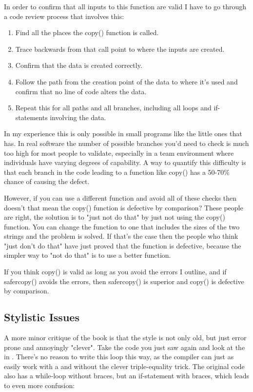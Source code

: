 In order to confirm that all inputs to this function are valid I have to 
go through a code review process that involves this:

\begin{enumerate}
\item Find all the places the copy() function is called.
\item Trace backwards from that call point to where the inputs are created.
\item Confirm that the data is created correctly.
\item Follow the path from the creation point of the data to where it's used and confirm that
    no line of code alters the data.
\item Repeat this for all paths and all branches, including all loops and if-statements
    involving the data.
\end{enumerate}

In my experience this is only possible in small programs like the little ones
that \krc has.  In real software the number of possible branches you'd need to
check is much too high for most people to validate, especially in a team
environment where individuals have varying degrees of capability.  A way to
quantify this difficulty is that each branch in the code leading to a function
like copy() has a 50-70\% chance of causing the defect.

However, if you can use a different function and avoid all of these checks then
doesn't that mean the copy() function is defective by comparison?  These people
are right, the solution is to "just not do that" by just not using the copy()
function.  You can change the function to one that includes the sizes of the
two strings and the problem is solved.  If that's the case then the people who
think "just don't do that" have just proved that the function is defective,
because the simpler way to "not do that" is to use a better function.

If you think copy() is valid as long as you avoid the errors I outline, and if
safercopy() avoids the errors, then safercopy() is superior and copy() is defective
by comparison.


\subsection{Stylistic Issues}

A more minor critique of the book is that the style is not only old, but just
error prone and annoyingly "clever".  Take the code you just saw again and look
at the  in .  There's no reason to write this
loop this way, as the compiler can just as easily work with a 
and without the clever triple-equality trick.  The original code also
has a while-loop without braces, but an if-statement with braces, which
leads to even more confusion:

